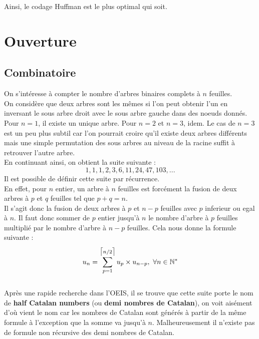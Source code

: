 \documentclass[a4paper, 12pt]{article}
\DeclarePairedDelimiter{\ceil}{\lceil}{\rceil}
\begin{document}
Ainsi, le codage Huffman est le plus optimal qui soit.

\newpage

\section{Ouverture}

\subsection{Combinatoire}
On s'intéresse à compter le nombre d'arbres binaires complets à $n$ feuilles. \\
On considère que deux arbres sont les mêmes si l'on peut obtenir l'un en inversant le sous arbre droit avec le sous arbre gauche dans des noeuds donnés. \\
Pour $n = 1$, il existe un unique arbre. Pour $n = 2$ et $n = 3$, idem. Le cas de $n = 3$ est un peu plus subtil car l'on pourrait croire qu'il existe deux arbres différents mais une simple permutation des sous arbres au niveau de la racine suffit à retrouver l'autre arbre. \\
En continuant ainsi, on obtient la suite suivante : \\
$$
1, 1, 1, 2, 3, 6, 11, 24, 47, 103, ...
$$
Il est possible de définir cette suite par récurrence. \\
En effet, pour $n$ entier, un arbre à $n$ feuilles est forcément la fusion de deux arbres à $p$ et $q$ feuilles tel que $p+q = n$. \\
Il s'agit donc la fusion de deux arbres à $p$ et $n-p$ feuilles avec $p$ inferieur ou egal à $n$.
Il faut donc sommer de $p$ entier jusqu'à $n$ le nombre d'arbre à $p$ feuilles multiplié par le nombre d'arbre à $n-p$ feuilles.
Cela nous donne la formule suivante :
$$
u_n = \sum_{p = 1}^{\ceil[\big]{n/2}} u_p\times u_{n-p},\ \forall n \in \mathbb{N}^*
$$
\\
Après une rapide recherche dans l'OEIS, il se trouve que cette suite porte le nom de \textbf{half Catalan numbers} (ou \textbf{demi nombres de Catalan}), on voit aisément d'où vient le nom car les nombres de Catalan sont générés à partir de la même formule à l'exception que la somme va jusqu'à $n$. Malheureusement il n'existe pas de formule non récursive des demi nombres de Catalan.
\end{document}
